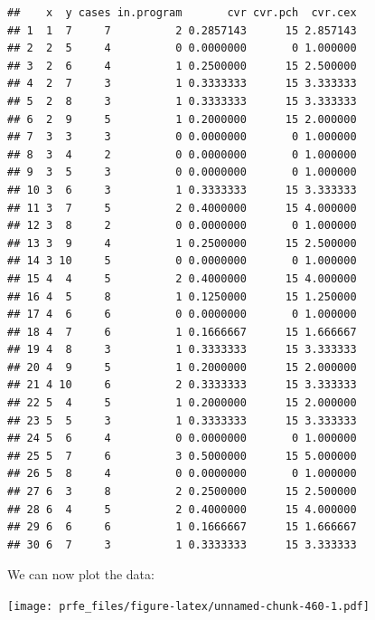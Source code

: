 \documentclass[12pt,a4paper]{book}
\newenvironment{Shaded}{\begin{snugshade}}{\end{snugshade}}
\newcommand{\DataTypeTok}[1]{\textcolor[rgb]{0.13,0.29,0.53}{#1}}
\newcommand{\KeywordTok}[1]{\textcolor[rgb]{0.13,0.29,0.53}{\textbf{#1}}}
\newcommand{\NormalTok}[1]{#1}
\newcommand{\OperatorTok}[1]{\textcolor[rgb]{0.81,0.36,0.00}{\textbf{#1}}}
\newcommand{\StringTok}[1]{\textcolor[rgb]{0.31,0.60,0.02}{#1}}
\theoremstyle{definition}
\theoremstyle{definition}
\theoremstyle{definition}
\theoremstyle{remark}
\begin{document}
\begin{verbatim}
##    x  y cases in.program       cvr cvr.pch  cvr.cex
## 1  1  7     7          2 0.2857143      15 2.857143
## 2  2  5     4          0 0.0000000       0 1.000000
## 3  2  6     4          1 0.2500000      15 2.500000
## 4  2  7     3          1 0.3333333      15 3.333333
## 5  2  8     3          1 0.3333333      15 3.333333
## 6  2  9     5          1 0.2000000      15 2.000000
## 7  3  3     3          0 0.0000000       0 1.000000
## 8  3  4     2          0 0.0000000       0 1.000000
## 9  3  5     3          0 0.0000000       0 1.000000
## 10 3  6     3          1 0.3333333      15 3.333333
## 11 3  7     5          2 0.4000000      15 4.000000
## 12 3  8     2          0 0.0000000       0 1.000000
## 13 3  9     4          1 0.2500000      15 2.500000
## 14 3 10     5          0 0.0000000       0 1.000000
## 15 4  4     5          2 0.4000000      15 4.000000
## 16 4  5     8          1 0.1250000      15 1.250000
## 17 4  6     6          0 0.0000000       0 1.000000
## 18 4  7     6          1 0.1666667      15 1.666667
## 19 4  8     3          1 0.3333333      15 3.333333
## 20 4  9     5          1 0.2000000      15 2.000000
## 21 4 10     6          2 0.3333333      15 3.333333
## 22 5  4     5          1 0.2000000      15 2.000000
## 23 5  5     3          1 0.3333333      15 3.333333
## 24 5  6     4          0 0.0000000       0 1.000000
## 25 5  7     6          3 0.5000000      15 5.000000
## 26 5  8     4          0 0.0000000       0 1.000000
## 27 6  3     8          2 0.2500000      15 2.500000
## 28 6  4     5          2 0.4000000      15 4.000000
## 29 6  6     6          1 0.1666667      15 1.666667
## 30 6  7     3          1 0.3333333      15 3.333333
\end{verbatim}

We can now plot the data:

\begin{Shaded}
\end{Shaded}

\texttt{[image: prfe\_files/figure-latex/unnamed-chunk-460-1.pdf]}
\end{document}
